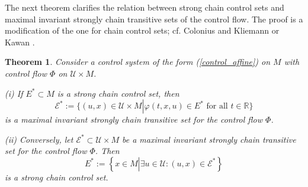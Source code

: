 \documentclass[preprint,12pt]{elsarticle}
\newtheorem{theorem}{Theorem}
\begin{document}
The next theorem clarifies the relation between strong chain control sets and
maximal invariant strongly chain transitive sets of the control flow. The
proof is a modification of the one for chain control sets; cf. Colonius and
Kliemann \cite[Theorem 4.3.11]{ColK00} or Kawan \cite[Proposition
1.24(iv)]{Kawa13}.

\begin{theorem}
\label{Theorem_equivalence}Consider a control system of the form
(\ref{control_affine}) on $M$ with control flow $\Phi$ on $\mathcal{U}\times
M$.

(i) If $E^{\ast}\subset M$ is a strong chain control set, then%
\begin{equation}
\mathcal{E}^{\ast}:=\{(u,x)\in\mathcal{U}\times M\left\vert \varphi(t,x,u)\in
E^{\ast}\text{ for all }t\in\mathbb{R}\right.  \} \label{lift_E}%
\end{equation}
is a maximal invariant strongly chain transitive set for the control flow
$\Phi$.

(ii) Conversely, let $\mathcal{E}^{\ast}\subset\mathcal{U}\times M$ be a
maximal invariant strongly chain transitive set for the control flow $\Phi$.
Then
\begin{equation}
E^{\ast}:=\left\{  x\in M\left\vert \exists u\in\mathcal{U}:(u,x)\in
\mathcal{E}^{\ast}\right.  \right\}  \label{down_E}%
\end{equation}
is a strong chain control set.
\end{theorem}
\end{document}
